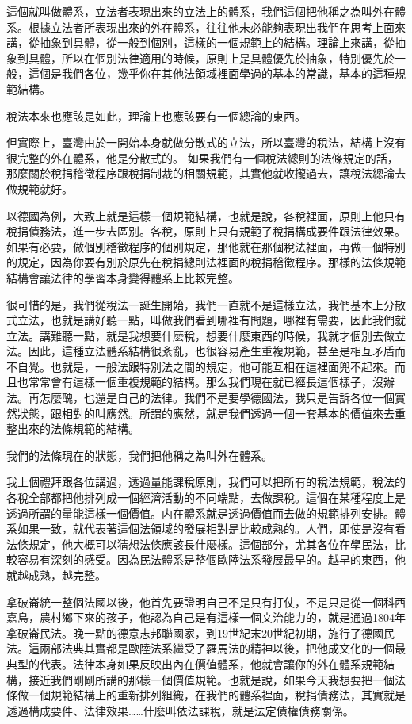 \documentclass[]{ctexbook}
\begin{document}
這個就叫做體系，立法者表現出來的立法上的體系，我們這個把他稱之為叫外在體系。根據立法者所表現出來的外在體系，往往他未必能夠表現出我們在思考上面來講，從抽象到具體，從一般到個別，這樣的一個規範上的結構。理論上來講，從抽象到具體，所以在個別法律適用的時候，原則上是具體優先於抽象，特別優先於一般，這個是我們各位，幾乎你在其他法領域裡面學過的基本的常識，基本的這種規範結構。

稅法本來也應該是如此，理論上也應該要有一個總論的東西。

但實際上，臺灣由於一開始本身就做分散式的立法，所以臺灣的稅法，結構上沒有很完整的外在體系，他是分散式的。
如果我們有一個稅法總則的法條規定的話，那麼關於稅捐稽徵程序跟稅捐制裁的相關規範，其實他就收攏過去，讓稅法總論去做規範就好。

以德國為例，大致上就是這樣一個規範結構，也就是說，各稅裡面，原則上他只有稅捐債務法，進一步去區別。各稅，原則上只有規範了稅捐構成要件跟法律效果。如果有必要，做個別稽徵程序的個別規定，那他就在那個稅法裡面，再做一個特別的規定，因為你要有別於原先在稅捐總則法裡面的稅捐稽徵程序。那樣的法條規範結構會讓法律的學習本身變得體系上比較完整。

很可惜的是，我們從稅法一誕生開始，我們一直就不是這樣立法，我們基本上分散式立法，也就是講好聽一點，叫做我們看到哪裡有問題，哪裡有需要，因此我們就立法。講難聽一點，就是我想要什麽稅，想要什麼東西的時候，我就才個別去做立法。因此，這種立法體系結構很紊亂，也很容易產生重複規範，甚至是相互矛盾而不自覺。也就是，一般法跟特別法之間的規定，他可能互相在這裡面兜不起來。而且也常常會有這樣一個重複規範的結構。那么我們現在就已經長這個樣子，沒辦法。再怎麼醜，也還是自己的法律。我們不是要學德國法，我只是告訴各位一個實然狀態，跟相對的叫應然。所謂的應然，就是我們透過一個一套基本的價值來去重整出來的法條規範的結構。

我們的法條現在的狀態，我們把他稱之為叫外在體系。

我上個禮拜跟各位講過，透過量能課稅原則，我們可以把所有的稅法規範，稅法的各稅全部都把他排列成一個經濟活動的不同端點，去做課稅。這個在某種程度上是透過所謂的量能這樣一個價值。内在體系就是透過價值而去做的規範排列安排。體系如果一致，就代表著這個法領域的發展相對是比較成熟的。人們，即使是沒有看法條規定，他大概可以猜想法條應該長什麼樣。這個部分，尤其各位在學民法，比較容易有深刻的感受。因為民法體系是整個歐陸法系發展最早的。越早的東西，他就越成熟，越完整。

拿破崙統一整個法國以後，他首先要證明自己不是只有打仗，不是只是從一個科西嘉島，農村鄉下來的孩子，他認為自己是有這樣一個文治能力的，就是通過1804年拿破崙民法。晚一點的德意志邦聯國家，到19世紀末20世紀初期，施行了德國民法。這兩部法典其實都是歐陸法系繼受了羅馬法的精神以後，把他成文化的一個最典型的代表。法律本身如果反映出內在價值體系，他就會讓你的外在體系規範結構，接近我們剛剛所講的那樣一個價值規範。也就是說，如果今天我想要把一個法條做一個規範結構上的重新排列組織，在我們的體系裡面，稅捐債務法，其實就是透過構成要件、法律效果\ldots\ldots 什麼叫依法課稅，就是法定債權債務關係。
\end{document}
